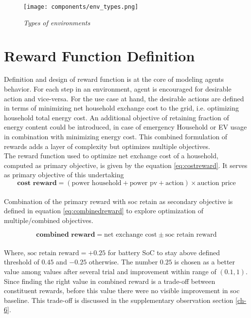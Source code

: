 \begin{large}
\begin{figure}[h]
	\begin{center}
		\texttt{[image: components/env\_types.png]}
		\caption{ \textit{Types of environments}}
		\label{fig:env_types}
	\end{center}
\end{figure}


\section{Reward Function Definition}

Definition and design of reward function is at the core of modeling agents behavior. For each step in an environment, agent is encouraged for desirable action and vice-versa. For the use case at hand, the desirable actions are defined in terms of minimizing net household exchange cost to the grid, i.e. optimizing household total energy cost. An additional objective of retaining fraction of energy content could be introduced, in case of emergency Household or EV usage in combination with minimizing energy cost. This combined formulation of rewards adds a layer of complexity but optimizes multiple objectives. \\

The reward function used to optimize net exchange cost of a household, computed as primary objective, is given by the equation \ref{eq:costreward}. It serves as primary objective of this undertaking \\


\begin{equation}
	\boxed{
		\textbf{cost reward} = \left(\text{power household} + \text{power pv} + \text{action}\right) \times \text{auction price}
	}
	\label{eq:costreward}
	\tag{3}
\end{equation} \\

Combination of the primary reward with soc retain as secondary objective is defined in equation \ref{eq:combinedreward} to explore optimization of multiple/combined objectives.

\begin{equation}
	\boxed{
		\textbf{combined reward} = \text{net exchange cost} \pm \text{soc retain reward} 
	}
	\label{eq:combinedreward}
	\tag{4}
\end{equation} \\

Where, $\text{soc retain reward} = +0.25$ for battery SoC to stay above defined threshold of $0.45$ and $-0.25$ otherwise. The number $0.25$ is chosen as a better value among values after several trial and improvement within range of $(0.1, 1)$. Since finding the right value in combined reward is a trade-off between constituent rewards, before this value there were no visible improvement in soc baseline. This trade-off is discussed in the supplementary observation section \ref{ch-6}. 


\end{large}
